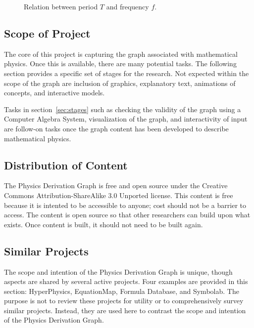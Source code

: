 \documentclass{article}
\begin{document}
\begin{multicols}{2}
\begin{center}
\begin{figure}
\caption{Relation between period $T$ and frequency $f$.\label{fig:freq_period}}
\end{figure}
\end{center}

\subsection{Scope of Project\label{sec:scope}}

The core of this project is capturing the graph associated with mathematical physics. Once this is available, there are many potential tasks. The following section provides a specific set of stages for the research. Not expected within the scope of the graph are inclusion of graphics, explanatory text, animations of concepts, and interactive models. 

Tasks in section~\ref{sec:stages} such as checking the validity of the graph using a Computer Algebra System, visualization of the graph, and interactivity of input are follow-on tasks once the graph content has been developed to describe mathematical physics.

\subsection{Distribution of Content\label{sec:distribution}}

The Physics Derivation Graph is free and open source under the Creative Commons Attribution-ShareAlike 3.0 Unported license. This content is free because it is intented to be accessible to anyone; cost should not be a barrier to access. The content is open source so that other researchers can build upon what exists. Once content is built, it should not need to be built again. 

\subsection{Similar Projects\label{sec:similar_projects}}

The scope and intention of the Physics Derivation Graph is unique, though aspects are shared by several active projects. Four examples are provided in this section: HyperPhysics, EquationMap, Formula Database, and Symbolab. The purpose is not to review these projects for utility or to comprehensively survey similar projects. Instead, they are used here to contrast the scope and intention of the Physics Derivation Graph. 


\end{multicols}
\end{document}

